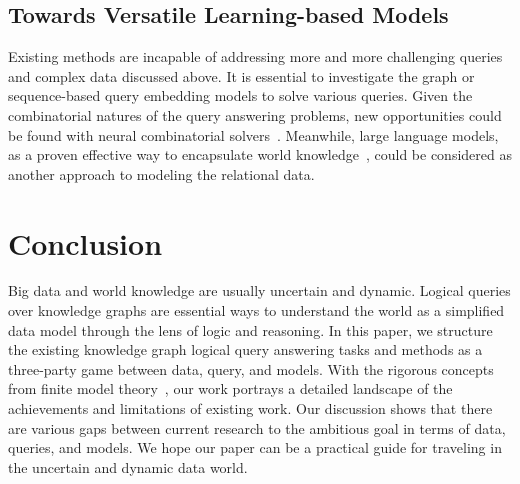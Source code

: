 \documentclass[11pt]{article}
\begin{document}
\subsection{Towards Versatile Learning-based Models}
Existing methods are incapable of addressing more and more challenging queries and complex data discussed above. It is essential to investigate the graph or sequence-based query embedding models to solve various queries. Given the combinatorial natures of the query answering problems, new opportunities could be found with neural combinatorial solvers~\cite{DBLP:conf/iclr/BelloPL0B17}. Meanwhile, large language models, as a proven effective way to encapsulate world knowledge~\cite{petroni2019language,brown2020language}, could be considered as another approach to modeling the relational data.

\section{Conclusion}
Big data and world knowledge are usually uncertain and dynamic. Logical queries over knowledge graphs are essential ways to understand the world as a simplified data model through the lens of logic and reasoning.
In this paper, we structure the existing knowledge graph logical query answering tasks and methods as a three-party game between data, query, and models. With the rigorous concepts from finite model theory~\cite{Marker2002Modeltheory,Libkin2004ElementsFinite}, our work portrays a detailed landscape of the achievements and limitations of existing work. Our discussion shows that there are various gaps between current research to the ambitious goal in terms of data, queries, and models. We hope our paper can be a practical guide for traveling in the uncertain and dynamic data world.

% 
% 
\end{document}
